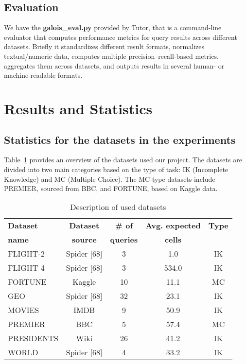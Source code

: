 \documentclass[12pt,a4paper]{article}
\begin{document}
\subsection{Evaluation}
We have the \textbf{galois\_eval.py} provided by Tutor, that is a command-line evaluator that computes performance metrics for query results across different datasets.
Briefly it standardizes different result formats, normalizes textual/numeric data, computes multiple precision–recall-based metrics, aggregates them across datasets, and outputs results in several human- or machine-readable formats.

\section{Results and Statistics}
\subsection{Statistics for the datasets in the experiments}
Table~\ref{tab:datasets} provides an overview of the datasets used our project. The datasets are divided into two main categories based on the type of task: IK (Incomplete Knowledge) and MC (Multiple Choice).
The MC-type datasets include PREMIER, sourced from BBC, and FORTUNE, based on Kaggle data.

\begin{table}[h]
\centering
\begin{tabular}{lcccc}
\toprule
\textbf{Dataset} & \textbf{Dataset} & \textbf{\# of} & \textbf{Avg. expected} & \textbf{Type} \\
\textbf{name} & \textbf{source} & \textbf{queries} & \textbf{cells} & \\
\midrule
FLIGHT-2 & Spider [68] & 3 & 1.0 & IK \\
FLIGHT-4 & Spider [68] & 3 & 534.0 & IK \\
FORTUNE & Kaggle & 10 & 11.1 & MC \\
GEO & Spider [68] & 32 & 23.1 & IK \\
MOVIES & IMDB & 9 & 50.9 & IK \\
PREMIER & BBC & 5 & 57.4 & MC \\
PRESIDENTS & Wiki & 26 & 41.2 & IK \\
WORLD & Spider [68] & 4 & 33.2 & IK \\


\bottomrule
\end{tabular}
\caption{Description of used datasets}
\label{tab:datasets}
\end{table}
\end{document}
